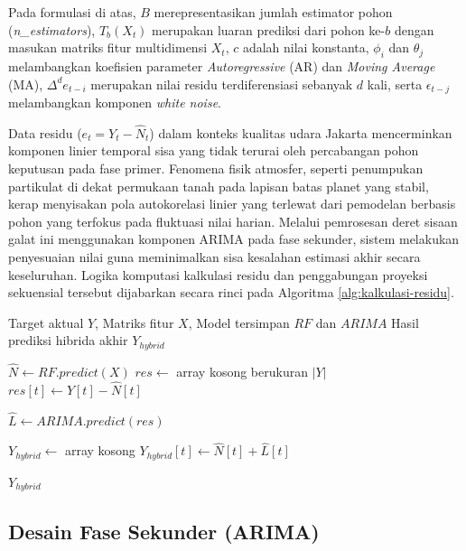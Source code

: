 Pada formulasi di atas, $B$ merepresentasikan jumlah estimator pohon (\textit{n\_estimators}), $T_b(X_t)$ merupakan luaran prediksi dari pohon ke-$b$ dengan masukan matriks fitur multidimensi $X_t$, $c$ adalah nilai konstanta, $\phi_i$ dan $\theta_j$ melambangkan koefisien parameter \textit{Autoregressive} (AR) dan \textit{Moving Average} (MA), $\Delta^d e_{t-i}$ merupakan nilai residu terdiferensiasi sebanyak $d$ kali, serta $\epsilon_{t-j}$ melambangkan komponen \textit{white noise}.

Data residu ($e_t = Y_t - \hat{N}_t$) dalam konteks kualitas udara Jakarta mencerminkan komponen linier temporal sisa yang tidak terurai oleh percabangan pohon keputusan pada fase primer. Fenomena fisik atmosfer, seperti penumpukan partikulat di dekat permukaan tanah pada lapisan batas planet yang stabil, kerap menyisakan pola autokorelasi linier yang terlewat dari pemodelan berbasis pohon yang terfokus pada fluktuasi nilai harian. Melalui pemrosesan deret sisaan galat ini menggunakan komponen ARIMA pada fase sekunder, sistem melakukan penyesuaian nilai guna meminimalkan sisa kesalahan estimasi akhir secara keseluruhan. Logika komputasi kalkulasi residu dan penggabungan proyeksi sekuensial tersebut dijabarkan secara rinci pada Algoritma \ref{alg:kalkulasi-residu}.

\begin{algorithm}[htbp]
\caption{Kalkulasi Residu Hibrida Sekuensial}
\label{alg:kalkulasi-residu}
\begin{algorithmic}[1]
\Require Target aktual $Y$, Matriks fitur $X$, Model tersimpan $RF$ dan $ARIMA$
\Ensure Hasil prediksi hibrida akhir $Y_{hybrid}$

\State $\hat{N} \gets RF.predict(X)$ 
\State $res \gets$ array kosong berukuran $|Y|$
    \State $res[t] \gets Y[t] - \hat{N}[t]$ 
\EndFor

\State $\hat{L} \gets ARIMA.predict(res)$ 

\State $Y_{hybrid} \gets$ array kosong
    \State $Y_{hybrid}[t] \gets \hat{N}[t] + \hat{L}[t]$
\EndFor

\State \Return $Y_{hybrid}$
\end{algorithmic}
\end{algorithm}

\subsection{Desain Fase Sekunder (ARIMA)}

